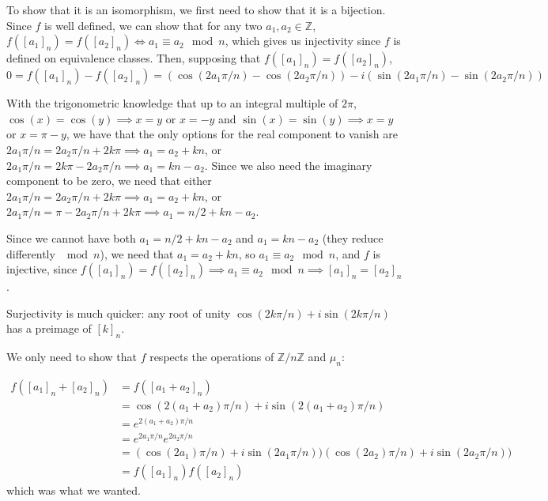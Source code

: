 \documentclass[12pt,letterpaper]{article}
\theoremstyle{definition}
\newcommand{\Z}{\mathbb{Z}}
\begin{document}
To show that it is an isomorphism, we first need to show that it is a bijection. Since $f$ is well defined, we can show that for any two $a_1, a_2 \in \Z$, $f([a_1]_n) = f([a_2]_n) \iff a_1 \equiv a_2 \mod n$, which gives us injectivity since $f$ is defined on equivalence classes. Then, supposing that $f([a_1]_n) = f([a_2]_n)$,
\[
  0 = f([a_1]_n) - f([a_2]_n) = (\cos(2a_1\pi / n) - \cos(2a_2\pi / n)) - i(\sin(2a_1\pi / n) - \sin(2a_2\pi / n))
\]

With the trigonometric knowledge that up to an integral multiple of $2\pi$, $\cos(x) = \cos(y) \implies x = y$ or $x = - y$ and $\sin(x) = \sin(y) \implies x=y$ or $x = \pi - y$, we have that the only options for the real component to vanish are $2a_1\pi / n = 2a_2\pi /n + 2k\pi \implies a_1 = a_2 + kn$, or $2a_1\pi /n = 2k\pi - 2a_2\pi / n \implies a_1 = kn - a_2$. Since we also need the imaginary component to be zero, we need that either $2a_1\pi / n = 2a_2\pi /n +2k\pi \implies a_1 = a_2 + kn$, or $2a_1\pi / n = \pi - 2a_2\pi / n + 2k\pi \implies a_1 =  n / 2 + kn - a_2$.

Since we cannot have both $a_1 = n / 2 + kn -a_2$ and $a_1 = kn - a_2$ (they reduce differently $\mod n$), we need that $a_1 = a_2 + kn$, so $a_1 \equiv a_2 \mod n$, and $f$ is injective, since $f([a_1]_n) = f([a_2]_n) \implies a_1 \equiv a_2 \mod n \implies [a_1]_n = [a_2]_n$.

Surjectivity is much quicker: any root of unity $\cos(2k\pi / n) + i\sin(2k\pi / n)$ has a preimage of $[k]_n$.

We only need to show that $f$ respects the operations of $\Z / n\Z$ and $\mu_n$: 

\begin{align*}
  f([a_1]_n + [a_2]_n) &= f([a_1 + a_2]_n) \\
                       &= \cos(2(a_1 + a_2)\pi / n) + i\sin(2(a_1 + a_2)\pi / n) \\
                       &= e^{2(a_1 + a_2)\pi / n} \\
                       &= e^{2a_1 \pi / n}e^{2a_2 \pi / n} \\
                       &= (\cos(2a_1)\pi / n) + i\sin(2a_1\pi / n))(\cos(2a_2)\pi / n) + i\sin(2a_2\pi / n)) \\
                       &= f([a_1]_n)f([a_2]_n)
\end{align*}
which was what we wanted.
\end{document}

